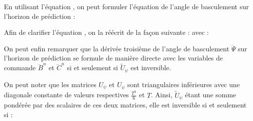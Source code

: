 					En utilisant l'équation , on peut formuler l'équation de l'angle de basculement sur l'horizon de prédiction :
					
					Afin de clarifier l'équation , on la réécrit de la façon suivante :
					avec :
				
					
					On peut enfin remarquer que la dérivée troisième de l'angle de basculement $\dddot\Psi$ sur l'horizon de prédiction se formule de manière directe avec les variables de commande $\dddot{B}^n$ et $\dddot{C}^n$
					si et seulement si $\tilde{U}_\psi$ est inversible.
				
					On peut noter que les matrices $U_\psi$ et $U_{\ddot{\psi}}$ sont triangulaires inférieures avec une diagonale constante de valeurs respectives $\frac{T^3}{6}$ et $T$.
					Ainsi, $\tilde{U}_\psi$ étant une somme pondérée par des scalaires de ces deux matrices, elle est inversible si et seulement si :
					
